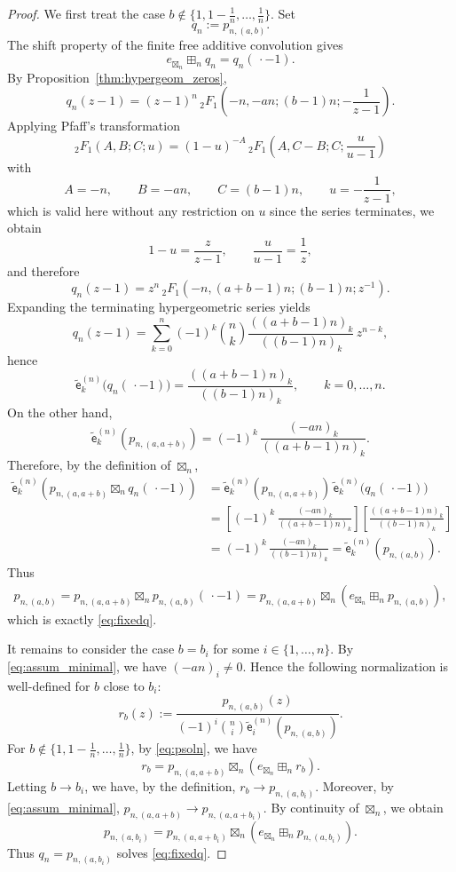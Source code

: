 \documentclass[a4paper,11pt]{amsart}
\numberwithin{equation}{section}
\newcommand{\coef}[2]{\widetilde{\mathsf{e}}_{#1}^{(#2)}} %
\begin{document}
\begin{proof}
We first treat the case
\(
b\notin\{1,1-\frac1n,\ldots,\frac1n\}.
\)
Set
\[
q_n:=p_{n,(a,b)}.
\]
The shift property of the finite free additive
convolution gives
\[
e_{\boxtimes_n}\boxplus_n q_n = q_n(\,\cdot-1).
\]
By Proposition~\ref{thm:hypergeom_zeros},
\[
q_n(z-1)
=
(z-1)^n\,{}_2F_1\!\left(-n,-an;(b-1)n;-\frac{1}{z-1}\right).
\]
Applying Pfaff's transformation 
\[
{}_2F_1(A,B;C;u)
=
(1-u)^{-A}\,
{}_2F_1\!\left(A,C-B;C;\frac{u}{u-1}\right)
\]
with
\[
A=-n,\qquad B=-an,\qquad C=(b-1)n,\qquad u=-\frac{1}{z-1},
\]
which is valid here without any restriction on \(u\) since the series terminates, we obtain
\[
1-u=\frac{z}{z-1},
\qquad
\frac{u}{u-1}=\frac{1}{z},
\]
and therefore
\[
q_n(z-1)
=
z^n\,{}_2F_1\!\left(-n,(a+b-1)n;(b-1)n;z^{-1}\right).
\]
Expanding the terminating hypergeometric series yields
\[
q_n(z-1)
=
\sum_{k=0}^n
(-1)^k\binom{n}{k}
\frac{((a+b-1)n)_k}{((b-1)n)_k}
\,z^{n-k},
\]
hence
\[
\coef{k}{n}\!\bigl(q_n(\,\cdot-1)\bigr)
=
\frac{((a+b-1)n)_k}{((b-1)n)_k},
\qquad k=0,\ldots,n.
\]
On the other hand,
\[
\coef{k}{n}\!\left(p_{n,(a,a+b)}\right)
=
(-1)^k\,\frac{(-an)_k}{((a+b-1)n)_k}.
\]
Therefore, by the definition of \(\boxtimes_n\),
\begin{align*}
\coef{k}{n}\!\left(p_{n,(a,a+b)}\boxtimes_n q_n(\,\cdot-1)\right)
&=
\coef{k}{n}\!\left(p_{n,(a,a+b)}\right)\,
\coef{k}{n}\!\bigl(q_n(\,\cdot-1)\bigr)\\
&=
\left[(-1)^k\,\frac{(-an)_k}{((a+b-1)n)_k}\right]
\left[\frac{((a+b-1)n)_k}{((b-1)n)_k}\right]\\
&=
(-1)^k\,\frac{(-an)_k}{((b-1)n)_k}
=
\coef{k}{n}\!\left(p_{n,(a,b)}\right).
\end{align*}
Thus
\begin{align}\label{eq:psoln}
p_{n,(a,b)}
=
p_{n,(a,a+b)}\boxtimes_n p_{n,(a,b)}(\,\cdot-1) = p_{n,(a,a+b)}\boxtimes_n (e_{\boxtimes_n}\boxplus_n p_{n,(a,b)}),
\end{align}
which is exactly \eqref{eq:fixedq}.

It remains to consider the case \(b=b_i\) for some \(i\in\{1,\ldots,n\}\).
By \eqref{eq:assum_minimal}, we have \((-an)_i\neq0\). Hence the following
normalization is well-defined for \(b\) close to \(b_i\):
\[
r_b(z):=
\frac{
p_{n,(a,b)}(z)
}{
(-1)^i\binom{n}{i}\coef{i}{n}(p_{n,(a,b)})
}.
\]
For \(b\notin\{1,1-\frac1n,\ldots,\frac1n\}\), by \eqref{eq:psoln}, we have
\[
r_b
=
p_{n,(a,a+b)}\boxtimes_n (e_{\boxtimes_n}\boxplus_n r_b).
\]
Letting \(b\to b_i\), we have, by the definition,
$r_b\to p_{n,(a,b_i)}$.
Moreover, by \eqref{eq:assum_minimal},
$p_{n,(a,a+b)}\to p_{n,(a,a+b_i)}$.
By continuity of \(\boxtimes_n\), we obtain
\[
p_{n,(a,b_i)}
=
p_{n,(a,a+b_i)}
\boxtimes_n (e_{\boxtimes_n}\boxplus_n
p_{n,(a,b_i)}).
\]
Thus \(q_n=p_{n,(a,b_i)}\) solves \eqref{eq:fixedq}.
\end{proof}
\end{document}
